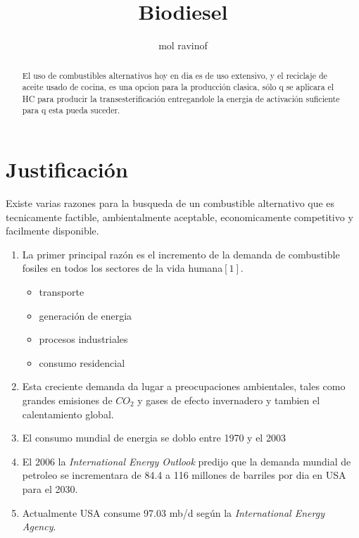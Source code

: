 \documentclass[a4paper,10pt]{article}
\title{Biodiesel}
\author{mol ravinof}
\begin{document}
\maketitle

\begin{abstract}
El uso de combustibles alternativos hoy en dia es de uso extensivo, y el reciclaje de aceite usado de cocina, es una opcion para la producción clasica, sólo q se aplicara el HC para producir la transesterificación entregandole la energia de activación suficiente para q esta pueda suceder.
\end{abstract}

\section{Justificación}
Existe varias razones para la busqueda de un combustible alternativo que es tecnicamente factible,
 ambientalmente aceptable, economicamente competitivo y facilmente disponible.
\begin{enumerate}
  \item La primer principal razón  es el incremento de la demanda de combustible fosiles en todos los 
  sectores de la vida humana$[1]$.
  	\begin{itemize}
  		\item transporte
  		\item generación de energia
  		\item procesos industriales
  		\item consumo residencial
  	\end{itemize}
  \item Esta creciente demanda da lugar a preocupaciones ambientales, tales como grandes 
  emisiones de $CO_2$ y gases de efecto invernadero y tambien el calentamiento global.
  \item El consumo mundial de energia se doblo entre 1970 y el 2003
  \item El 2006 la \emph{International Energy Outlook} predijo que la demanda mundial de petroleo 
  se incrementara de 84.4 a 116 millones de barriles por dia en USA para el 2030.
  \item Actualmente USA consume 97.03 mb/d según la \emph{International Energy Agency}.
\end{enumerate}
\end{document}
